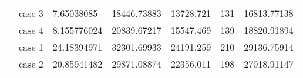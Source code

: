 \begin{table}[]
\begin{tabular}{cllllll}
    \rowcolor[HTML]{FFFFC7} 
    \cellcolor[HTML]{FFFFC7}                                                                                               & case 3                  & 7.65038085                                                                             & 18446.73883                                                                               & 13728.721                                                                           & 131                                                                        & 16813.77138                                                                                \\ \cline{2-7} 
    \rowcolor[HTML]{FFFFC7} 
    \multirow{-4}{*}{\cellcolor[HTML]{FFFFC7}2000}                                                                         & case 4                  & 8.155776024                                                                            & 20839.67217                                                                               & 15547.469                                                                           & 139                                                                        & 18820.91894                                                                                \\ \hline
    \rowcolor[HTML]{FFFFC7} 
    \cellcolor[HTML]{FFFFC7}                                                                                               & case 1                  & 24.18394971                                                                            & 32301.69933                                                                               & 24191.259                                                                           & 210                                                                        & 29136.75914                                                                                \\ \cline{2-7} 
    \rowcolor[HTML]{FFFFC7} 
    \cellcolor[HTML]{FFFFC7}                                                                                               & case 2                  & 20.85941482                                                                            & 29871.08874                                                                               & 22356.011                                                                           & 198                                                                        & 27018.91147                                                                                \\ \cline{2-7} 

\end{tabular}
\end{table}

